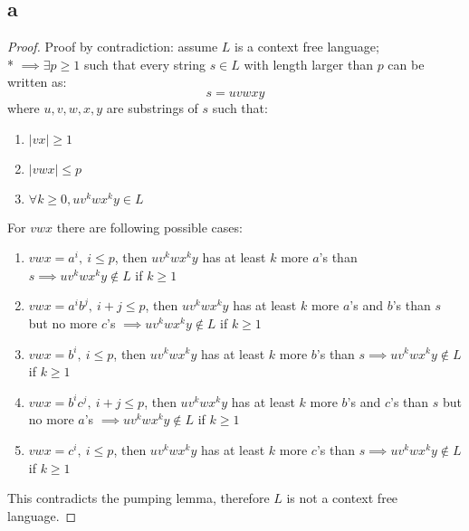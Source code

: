 \documentclass{article}
\begin{document}
\subsection*{a}
\begin{proof}
    Proof by contradiction: assume $L$ is a context free language;\\*
    $\implies \exists p \ge 1$ such that every string $s \in L$ with length larger than $p$ can be written as:
    $$s=uvwxy$$
    where $u,v,w,x,y$ are substrings of $s$ such that:
    \begin{enumerate}
        \item $|vx| \ge 1$
        \item $|vwx| \le p$
        \item $\forall k \ge 0, uv^kwx^ky \in L$
    \end{enumerate}
    \newpage
    For $vwx$ there are following possible cases:
    \begin{enumerate}
        \item $vwx=a^i,\ i \le p$, then $uv^kwx^ky$ has at least $k$ more $a$'s than $s \implies uv^kwx^ky \notin L$ if $k \ge 1$
        \item $vwx=a^ib^j,\ i+j \le p$, then $uv^kwx^ky$ has at least $k$ more $a$'s and $b$'s than $s$ but no more $c$'s $ \implies uv^kwx^ky \notin L$ if $k \ge 1$
        \item $vwx=b^i,\ i \le p$, then $uv^kwx^ky$ has at least $k$ more $b$'s than $s \implies uv^kwx^ky \notin L$ if $k \ge 1$
        \item $vwx=b^ic^j,\ i+j \le p$, then $uv^kwx^ky$ has at least $k$ more $b$'s and $c$'s than $s$ but no more $a$'s $ \implies uv^kwx^ky \notin L$ if $k \ge 1$
        \item $vwx=c^i,\ i \le p$, then $uv^kwx^ky$ has at least $k$ more $c$'s than $s \implies uv^kwx^ky \notin L$ if $k \ge 1$
    \end{enumerate}
    This contradicts the pumping lemma, therefore $L$ is not a context free language.
\end{proof}
\end{document}
